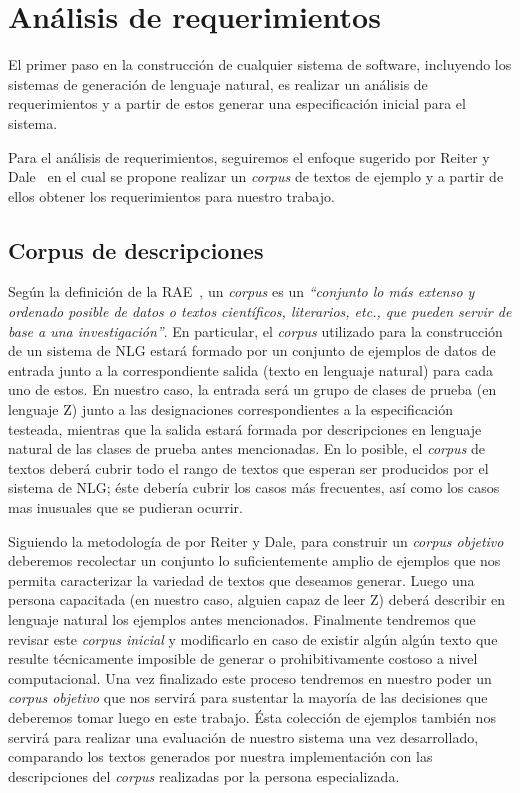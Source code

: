 \chapter{Análisis de requerimientos}
\label{cap:corpus}

El primer paso en la construcción de cualquier sistema de software, incluyendo los sistemas de generación de lenguaje natural, es realizar un análisis de requerimientos y a partir de estos generar una especificación inicial para el sistema. 

Para el análisis de requerimientos, seguiremos el enfoque sugerido por Reiter y Dale~\cite{reiter_dale} en el cual se propone realizar un \emph{corpus} de textos de ejemplo y a partir de ellos obtener los requerimientos para nuestro trabajo.

\section{Corpus de descripciones}                 

Según la definición de la RAE~\cite{dicrae}, un \emph{corpus} es un \emph{``conjunto lo más extenso y ordenado posible de datos o textos científicos, literarios, etc., que pueden servir de base a una investigación''}. En particular, el \emph{corpus} utilizado para la construcción de un sistema de NLG estará formado por un conjunto de ejemplos de datos de entrada junto a la correspondiente salida (texto en lenguaje natural) para cada uno de estos. En nuestro caso, la entrada será un grupo de clases de prueba (en lenguaje Z) junto a las designaciones correspondientes a la especificación testeada, mientras que la salida estará formada por descripciones en lenguaje natural de las clases de prueba antes mencionadas. En lo posible, el \emph{corpus} de textos deberá cubrir todo el rango de textos que esperan ser producidos por el sistema de NLG; éste debería cubrir los casos más frecuentes, así como los casos mas inusuales que se pudieran ocurrir.

Siguiendo la metodología de por Reiter y Dale, para construir un \emph{corpus objetivo} deberemos recolectar un conjunto lo suficientemente amplio de ejemplos que nos permita caracterizar la variedad de textos que deseamos generar. Luego una persona capacitada (en nuestro caso, alguien capaz de leer Z) deberá describir en lenguaje natural los ejemplos antes mencionados. Finalmente tendremos que revisar este \emph{corpus inicial} y modificarlo en caso de existir algún algún texto que resulte técnicamente imposible de generar o prohibitivamente costoso a nivel computacional. Una vez finalizado este proceso tendremos en nuestro poder un \emph{corpus objetivo} que nos servirá para sustentar la mayoría de las decisiones que deberemos tomar luego en este trabajo. Ésta colección de ejemplos también nos servirá para realizar una evaluación de nuestro sistema una vez desarrollado, comparando los textos generados por nuestra implementación con las descripciones del \emph{corpus} realizadas por la persona especializada.

